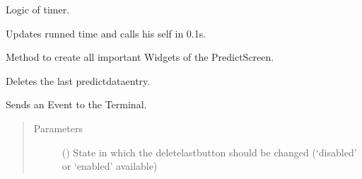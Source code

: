 \documentclass[letterpaper,10pt,english]{sphinxmanual}
\begin{document}
\begin{fulllineitems}
\begin{fulllineitems}
\end{fulllineitems}


\begin{fulllineitems}
\label{\detokenize{anoog.automation:anoog.automation.graphical_user_interface.Predict_Window.change_run_time}}
\sphinxAtStartPar
Logic of timer.

\sphinxAtStartPar
Updates runned time and calls his self in 0.1s.

\end{fulllineitems}


\begin{fulllineitems}
\label{\detokenize{anoog.automation:anoog.automation.graphical_user_interface.Predict_Window.create_widgets}}
\sphinxAtStartPar
Method to create all important Widgets of the Predict\sphinxhyphen{}Screen.

\end{fulllineitems}


\begin{fulllineitems}
\label{\detokenize{anoog.automation:anoog.automation.graphical_user_interface.Predict_Window.delete_last_btn_change}}
\sphinxAtStartPar
Deletes the last predict\sphinxhyphen{}data\sphinxhyphen{}entry.

\sphinxAtStartPar
Sends an Event to the Terminal.
\begin{quote}\begin{description}
\item[{Parameters}] \leavevmode
\sphinxAtStartPar
{} () \textendash{} State in which the delete\sphinxhyphen{}last\sphinxhyphen{}button should be changed (‘disabled’ or ‘enabled’ available)


\end{description}
\end{quote}
\end{fulllineitems}
\end{fulllineitems}
\end{document}
